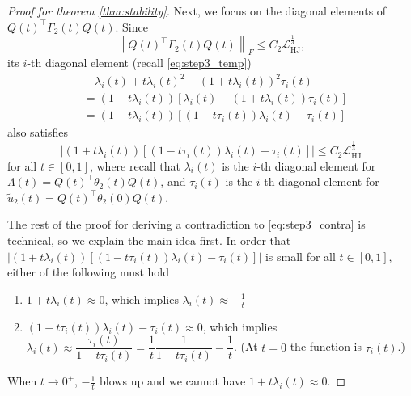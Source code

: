 \documentclass{article} %
\theoremstyle{plain}
\theoremstyle{definition}
\theoremstyle{remark}
\newcommand{\norm}[2][H^s]{\left\|#2\right\|_{#1}}
\newcommand{\LHJ}{\mathcal{L}_{\text{HJ}}}
\newcommand{\lam}{\lambda}
\newcommand{\Lam}{\Lambda}
\newcommand{\Ge}{\Gamma_2}
\newcommand{\wt}{\widetilde}
\newcommand{\tp}{^{\top}}
\newcommand{\sqbra}[1]{\left[#1\right]}
\newcommand{\abs}[1]{\left|#1\right|}
\begin{document}
\begin{proof}[Proof for theorem \ref{thm:stability}]
Next, we focus on the diagonal elements of $Q(t)\tp \Ge(t) Q(t)$. Since
\begin{equation}\label{eq:bound_Gamma2_uni}
\norm[F]{Q(t)\tp \Ge(t) Q(t)} \le C_2 \LHJ^{\frac13},
\end{equation}
its $i$-th diagonal element (recall \eqref{eq:step3_temp})
\begin{align*}
& \quad \lam_i(t) + t \lam_i(t)^2 - (1 + t\lam_i(t))^2 \tau_i(t) \\
& = (1 + t\lam_i(t)) \sqbra{\lam_i(t) - (1 + t\lam_i(t)) \tau_i(t)} \\
& = (1 + t\lam_i(t)) \sqbra{ (1-t \tau_i(t)) \lam_i(t) - \tau_i(t)}
\end{align*}
also satisfies
\begin{equation}\label{eq:step3_product_small}
\abs{(1 + t\lam_i(t)) \sqbra{ (1-t \tau_i(t)) \lam_i(t) - \tau_i(t)}} \le C_2 \LHJ^{\frac13}
\end{equation}
for all $t \in [0,1]$, where recall that $\lam_i(t)$ is the $i$-th diagonal element for $\Lam(t) = Q(t)\tp \theta_2(t)Q(t)$, and $\tau_i(t)$ is the $i$-th diagonal element for $\wt{u}_2(t) = Q(t)\tp \theta_2(0) Q(t)$.

The rest of the proof for deriving a contradiction to \eqref{eq:step3_contra} is technical, so we explain the main idea first. In order that $\abs{(1 + t\lam_i(t)) \sqbra{ (1-t \tau_i(t)) \lam_i(t) - \tau_i(t)}}$ is small for all $t \in [0,1]$, either of the following must hold
\begin{enumerate}
\item $1 + t\lam_i(t) \approx 0$, which implies $\lam_i(t) \approx -\frac{1}{t}$
\item $(1-t \tau_i(t)) \lam_i(t) - \tau_i(t) \approx 0$, which implies $\lam_i(t) \approx \dfrac{\tau_i(t)}{1 - t \tau_i(t)} = \dfrac{1}{t} \dfrac{1}{1 - t \tau_i(t)} -\dfrac{1}{t}$. (At $t=0$ the function is $\tau_i(t)$.)
\end{enumerate}
When $t \to 0^+$, $-\frac{1}{t}$ blows up and we cannot have $1 + t\lam_i(t) \approx 0$.


\end{proof}
\end{document}
